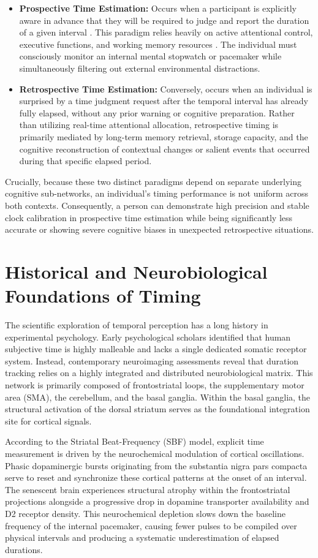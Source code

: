 \documentclass{custom_report}
\begin{document}
\begin{itemize}
    \item \textbf{Prospective Time Estimation:} Occurs when a participant is explicitly aware in advance that they will be required to judge and report the duration of a given interval \cite{Craik1999}. This paradigm relies heavily on active attentional control, executive functions, and working memory resources \cite{Craik1999}. The individual must consciously monitor an internal mental stopwatch or pacemaker while simultaneously filtering out external environmental distractions.
    \item \textbf{Retrospective Time Estimation:} Conversely, occurs when an individual is surprised by a time judgment request after the temporal interval has already fully elapsed, without any prior warning or cognitive preparation. Rather than utilizing real-time attentional allocation, retrospective timing is primarily mediated by long-term memory retrieval, storage capacity, and the cognitive reconstruction of contextual changes or salient events that occurred during that specific elapsed period.
\end{itemize}

Crucially, because these two distinct paradigms depend on separate underlying cognitive sub-networks, an individual's timing performance is not uniform across both contexts. Consequently, a person can demonstrate high precision and stable clock calibration in prospective time estimation while being significantly less accurate or showing severe cognitive biases in unexpected retrospective situations.

\section{Historical and Neurobiological Foundations of Timing}
The scientific exploration of temporal perception has a long history in experimental psychology. Early psychological scholars identified that human subjective time is highly malleable and lacks a single dedicated somatic receptor system. Instead, contemporary neuroimaging assessments reveal that duration tracking relies on a highly integrated and distributed neurobiological matrix. This network is primarily composed of frontostriatal loops, the supplementary motor area (SMA), the cerebellum, and the basal ganglia. Within the basal ganglia, the structural activation of the dorsal striatum serves as the foundational integration site for cortical signals.

According to the Striatal Beat-Frequency (SBF) model, explicit time measurement is driven by the neurochemical modulation of cortical oscillations. Phasic dopaminergic bursts originating from the substantia nigra pars compacta serve to reset and synchronize these cortical patterns at the onset of an interval. The senescent brain experiences structural atrophy within the frontostriatal projections alongside a progressive drop in dopamine transporter availability and D2 receptor density. This neurochemical depletion slows down the baseline frequency of the internal pacemaker, causing fewer pulses to be compiled over physical intervals and producing a systematic underestimation of elapsed durations.
\end{document}
